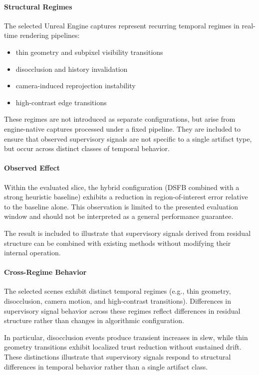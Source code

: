 \documentclass[11pt,letterpaper]{article}
\theoremstyle{gcresult}
\theoremstyle{definition}
\begin{document}
\paragraph{Structural Regimes}

The selected Unreal Engine captures represent recurring temporal regimes in real-time rendering pipelines:
\begin{itemize}
    \item thin geometry and subpixel visibility transitions
    \item disocclusion and history invalidation
    \item camera-induced reprojection instability
    \item high-contrast edge transitions
\end{itemize}

These regimes are not introduced as separate configurations, but arise from engine-native captures processed under a fixed pipeline. They are included to ensure that observed supervisory signals are not specific to a single artifact type, but occur across distinct classes of temporal behavior.

\paragraph{Observed Effect}

Within the evaluated slice, the hybrid configuration (DSFB combined with a strong heuristic baseline) exhibits a reduction in region-of-interest error relative to the baseline alone. This observation is limited to the presented evaluation window and should not be interpreted as a general performance guarantee.

The result is included to illustrate that supervisory signals derived from residual structure can be combined with existing methods without modifying their internal operation.


\paragraph{Cross-Regime Behavior}

The selected scenes exhibit distinct temporal regimes (e.g., thin geometry, disocclusion, camera motion, and high-contrast transitions). Differences in supervisory signal behavior across these regimes reflect differences in residual structure rather than changes in algorithmic configuration.

In particular, disocclusion events produce transient increases in slew, while thin geometry transitions exhibit localized trust reduction without sustained drift. These distinctions illustrate that supervisory signals respond to structural differences in temporal behavior rather than a single artifact class.
\end{document}
